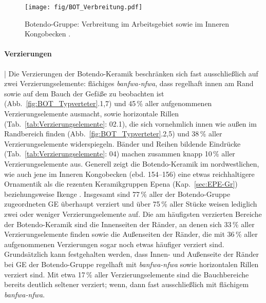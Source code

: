 \begin{figure*}[p]
	\centering
	\texttt{[image: fig/BOT\_Verbreitung.pdf]}
	\caption{Botendo-Gruppe: Verbreitung im Arbeitsgebiet sowie im Inneren Kongobecken \parencite[grau; nach][572--573 Karte 16]{Wotzka.1995}.}
	\label{fig:BOT_Verbreitung}
\end{figure*}

\paragraph{Verzierungen}\hspace{-.5em}|\hspace{.5em}%
Die Verzierungen der Botendo-Keramik beschränken sich fast ausschließlich auf zwei Verzierungselemente: flächiges \textit{banfwa-nfwa}, dass regelhaft innen am Rand sowie auf dem Bauch der Gefäße zu beobachten ist (Abb.~\ref{fig:BOT_Typverteter}.1,7) und 45\,\% aller aufgenommenen Verzierungselemente ausmacht, sowie horizontale Rillen (Tab.~\ref{tab:Verzierungselemente}: 02.1), die sich vornehmlich innen wie außen im Randbereich finden (Abb.~\ref{fig:BOT_Typverteter}.2,5) und 38\,\% aller Verzierungselemente widerspiegeln. Bänder und Reihen bildende Eindrücke (Tab.~\ref{tab:Verzierungselemente}: 04) machen zusammen knapp 10\,\% aller Verzierungselemente aus. Generell zeigt die Botendo-Keramik im nordwestlichen, wie auch jene im Inneren Kongobecken (ebd. 154--156) eine etwas reichhaltigere Ornamentik als die rezenten Keramikgruppen Epena (Kap.~\ref{sec:EPE-Gr}) beziehungsweise Ikenge \parencite{Eggert.1980c}. Insgesamt sind 77\,\% aller der Botendo-Gruppe zugeordneten GE überhaupt verziert und über 75\,\% aller Stücke weisen lediglich zwei oder weniger Verzierungselemente auf. Die am häufigsten verzierten Bereiche der Botendo-Keramik sind die Innenseiten der Ränder, an denen sich 33\,\% aller Verzierungselemente finden sowie die Außenseiten der Ränder, die mit 36\,\% aller aufgenommenen Verzierungen sogar noch etwas häufiger verziert sind. Grundsätzlich kann festgehalten werden, dass Innen- und Außenseite der Ränder bei GE der Botendo-Gruppe regelhaft mit \textit{banfwa-nfwa} sowie horizontalen Rillen verziert sind. Mit etwa 17\,\% aller Verzierungselemente sind die Bauchbereiche bereits deutlich seltener verziert; wenn, dann fast ausschließlich mit flächigem \textit{banfwa-nfwa}.


